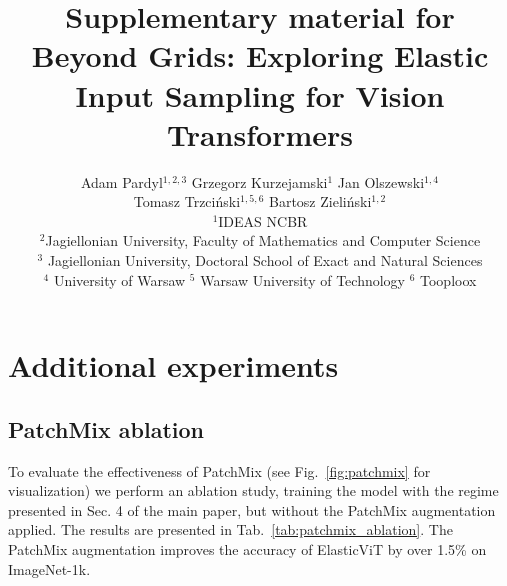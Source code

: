 \documentclass[10pt,twocolumn,letterpaper]{article}
\begin{document}

\title{Supplementary material for\\Beyond Grids: Exploring Elastic Input Sampling for Vision Transformers}

\author{Adam Pardyl$^{1,2,3}$ \qquad Grzegorz Kurzejamski$^{1}$ \qquad Jan Olszewski$^{1,4}$ \\
Tomasz Trzciński$^{1,5,6}$ \qquad Bartosz Zieliński$^{1,2}$ \\
$^1$IDEAS NCBR \\
$^2$Jagiellonian University, Faculty of Mathematics and Computer Science \\
$^3$ Jagiellonian University, Doctoral School of Exact and Natural
Sciences \\
$^4$ University of Warsaw \qquad $^5$ Warsaw University of Technology \qquad $^6$ Tooploox
}

\maketitle

\section{Additional experiments}

\subsection{PatchMix ablation}



To evaluate the effectiveness of PatchMix (see Fig.~\ref{fig:patchmix} for visualization) we perform an ablation study, training the model with the regime presented in Sec. 4 of the main paper, but without the PatchMix augmentation applied. The results are presented in Tab.~\ref{tab:patchmix_ablation}. The PatchMix augmentation improves the accuracy of ElasticViT by over 1.5\% on ImageNet-1k.
\end{document}
